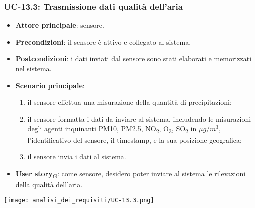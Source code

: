 \subsubsection{UC-13.3: Trasmissione dati qualità dell'aria}
\begin{itemize}
	\item \textbf{Attore principale}: sensore.
	\item \textbf{Precondizioni}: il sensore è attivo e collegato al sistema.
	\item \textbf{Postcondizioni}: i dati inviati dal sensore sono stati elaborati e memorizzati nel sistema.
	\item \textbf{Scenario principale}:
	      \begin{enumerate}
		      \item il sensore effettua una misurazione della quantità di precipitazioni;
		      \item il sensore formatta i dati da inviare al sistema, includendo le misurazioni degli agenti inquinanti PM10, PM2.5, NO\textsubscript{2}, O\textsubscript{3}, SO\textsubscript{2}
		            in $\mu g/m^3$, l'identificativo del sensore, il timestamp, e la sua posizione geografica;
		      \item il sensore invia i dati al sistema.
	      \end{enumerate}
	\item \href{https://7last.github.io/docs/rtb/documentazione-interna/glossario\#user-story}{\textbf{User story}\textsubscript{G}}:
	      come sensore, desidero poter inviare al sistema le rilevazioni della qualità dell'aria.
\end{itemize}

\begin{center}
	\texttt{[image: analisi\_dei\_requisiti/UC-13.3.png]}
\end{center}

